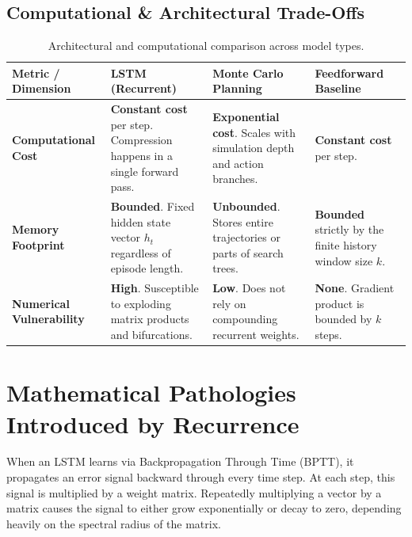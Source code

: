 \documentclass[11pt,a4paper]{article}
\begin{document}
\subsection{Computational \& Architectural Trade-Offs}
\begin{table}[h]
\centering
\small
\begin{tabular}{p{3.2cm} p{4.2cm} p{4.2cm} p{3.2cm}}
\toprule
\textbf{Metric / Dimension} & \textbf{LSTM (Recurrent)} & \textbf{Monte Carlo Planning} & \textbf{Feedforward Baseline} \\
\midrule
\textbf{Computational Cost} & \textbf{Constant cost} per step. Compression happens in a single forward pass. & \textbf{Exponential cost}. Scales with simulation depth and action branches. & \textbf{Constant cost} per step. \\
\addlinespace
\textbf{Memory Footprint} & \textbf{Bounded}. Fixed hidden state vector $h_t$ regardless of episode length. & \textbf{Unbounded}. Stores entire trajectories or parts of search trees. & \textbf{Bounded} strictly by the finite history window size $k$. \\
\addlinespace
\textbf{Numerical Vulnerability} & \textbf{High}. Susceptible to exploding matrix products and bifurcations. & \textbf{Low}. Does not rely on compounding recurrent weights. & \textbf{None}. Gradient product is bounded by $k$ steps. \\
\bottomrule
\end{tabular}
\caption{Architectural and computational comparison across model types.}
\end{table}

\section{Mathematical Pathologies Introduced by Recurrence}
When an LSTM learns via Backpropagation Through Time (BPTT), it propagates an error signal backward through every time step. At each step, this signal is multiplied by a weight matrix. Repeatedly multiplying a vector by a matrix causes the signal to either grow exponentially or decay to zero, depending heavily on the spectral radius of the matrix.
\end{document}
